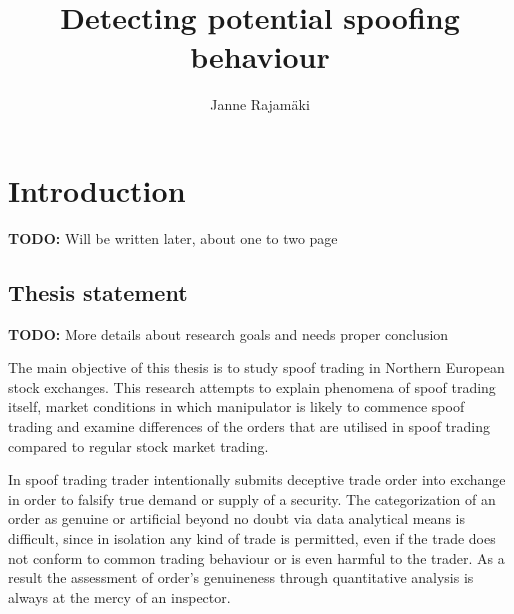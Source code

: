 \documentclass{tut-thesis}
\author 		{Janne Rajamäki}
\title 		[Potentiaalisten valekauppojen tunnistaminen]
			{Detecting potential spoofing behaviour}
\date 		{\Today}		%
\begin{document}
\maketitle

\frontmatter
\begin{abstract}
	\blindtext
\end{abstract}

\begin{otherlanguage}{finnish}
\begin{abstract}
\end{abstract}
\end{otherlanguage}

\tableofcontents


\mainmatter
\chapter{Introduction}
\textbf{TODO:} Will be written later, about one to two page 

\section{Thesis statement}
\textbf{TODO:} More details about research goals and needs proper conclusion

The main objective of this thesis is to study spoof trading in Northern European stock exchanges. This research attempts to explain phenomena of spoof trading itself, market conditions in which manipulator is likely to commence spoof trading and examine differences of the orders that are utilised in spoof trading compared to regular stock market trading. 

In spoof trading trader intentionally submits deceptive trade order into exchange in order to falsify true demand or supply of a security. The categorization of an order as genuine or artificial beyond no doubt via data analytical means is difficult, since in isolation any kind of trade is permitted, even if the trade does not conform to common trading behaviour or is even harmful to the trader. As a result the assessment of order's genuineness through quantitative analysis is always at the mercy of an inspector.
\end{document}

